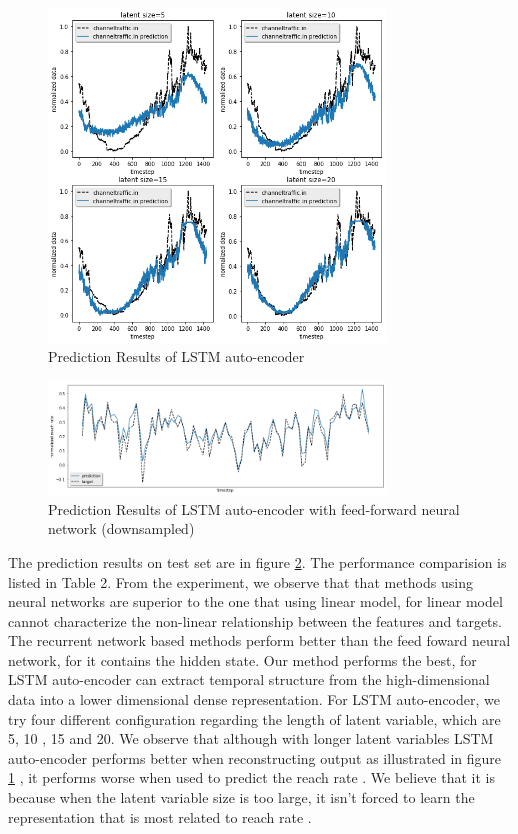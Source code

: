 \documentclass[5p]{elsarticle}
\newcommand{\dabiaolv}{reach rate }
\begin{document}
\begin{figure}[h]
    \centering
    \includegraphics[width=0.8\textwidth]{lstm_auto_encoder_result.png}
    \caption{Prediction Results of LSTM auto-encoder}
    \label{fig:prediction_Results_of_LSTM_auto_encoder}
\end{figure}

\begin{figure}[h]
    \centering
    \includegraphics[width=0.8\textwidth]{result.png}
    \caption{Prediction Results of LSTM auto-encoder with feed-forward neural network (downsampled)}
    \label{fig:prediction_results}
\end{figure}

The prediction results on test set are in figure \ref{fig:prediction_results}. The performance comparision is listed in Table 2. From the experiment, we observe that that methods using neural networks are superior to the one that using linear model, for linear model cannot characterize the non-linear relationship between the features and targets. The recurrent network based methods perform better than the feed foward neural network, for it contains the hidden state. Our method performs the best, for LSTM auto-encoder can extract temporal structure from the high-dimensional data into a lower dimensional dense representation. For LSTM auto-encoder, we try four different configuration regarding the length of latent variable, which are 5, 10 , 15 and 20. We observe that although with longer latent variables LSTM auto-encoder performs better when reconstructing output as illustrated in figure \ref{fig:prediction_Results_of_LSTM_auto_encoder} , it performs worse when used to predict the \dabiaolv . We believe that it is because when the latent variable size is too large, it isn't forced to learn the representation that is most related to \dabiaolv.     
 
\end{document}
